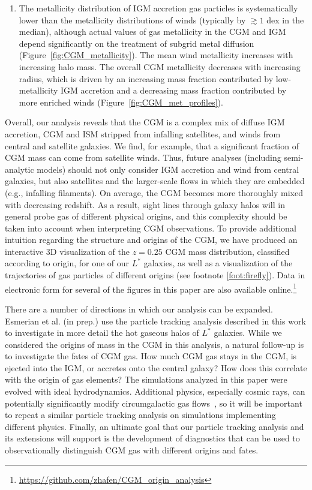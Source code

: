 \documentclass[fleqn,usenatbib]{mnras}
\begin{document}
\begin{enumerate}
\item The metallicity distribution of IGM accretion gas particles is systematically lower than the metallicity distributions of winds (typically by $\gtrsim 1$ dex in the median), although actual values of gas metallicity in the CGM and IGM depend significantly on the treatment of subgrid metal diffusion (Figure~\ref{fig:CGM_metallicity}).
The mean wind metallicity increases with increasing halo mass.
The overall CGM metallicity decreases with increasing radius, which is driven by an increasing mass fraction contributed by low-metallicity IGM accretion and a decreasing mass fraction contributed by more enriched winds (Figure~\ref{fig:CGM_met_profiles}).

\end{enumerate}
Overall, our analysis reveals that the CGM is a complex mix of diffuse IGM accretion, CGM and ISM stripped from infalling satellites, and winds from central and satellite galaxies.
We find, for example, that a significant fraction of CGM mass can come from satellite winds. 
Thus, future analyses (including semi-analytic models) should not only consider IGM accretion and wind from central galaxies, but also satellites and the larger-scale flows in which they are embedded (e.g., infalling filaments). 
On average, the CGM becomes more thoroughly mixed with decreasing redshift. 
As a result, sight lines through galaxy halos will in general probe gas of different physical origins, and this complexity should be taken into account when interpreting CGM observations. 
To provide additional intuition regarding the structure and origins of the CGM, we have produced an interactive 3D visualization of the $z=0.25$ CGM mass distribution, classified according to origin, for one of our $L^*$ galaxies, as well as a visualization of the trajectories of gas particles of different origins (see footnote \ref{foot:firefly}).
Data in electronic form for several of the figures in this paper are also available online.\footnote{\url{https://github.com/zhafen/CGM_origin_analysis}}

There are a number of directions in which our analysis can be expanded. 
Esmerian et al. (in prep.) use the particle tracking analysis described in this work to investigate in more detail the hot gaseous halos of $L^*$ galaxies. 
While we considered the origins of mass in the CGM in this analysis, a natural follow-up is to investigate the fates of CGM gas. 
How much CGM gas stays in the CGM, is ejected into the IGM, or accretes onto the central galaxy?
How does this correlate with the origin of gas elements? 
The simulations analyzed in this paper were evolved with ideal hydrodynamics. 
Additional physics, especially cosmic rays, can potentially significantly modify circumgalactic gas flows~\citep[e.g.][]{Chan2018a,Su2018a,Hopkins2019}, so it will be important to repeat a similar particle tracking analysis on simulations implementing different physics.
Finally, an ultimate goal that our particle tracking analysis and its extensions will support is the development of diagnostics that can be used to observationally distinguish CGM gas with different origins and fates.
\end{document}
